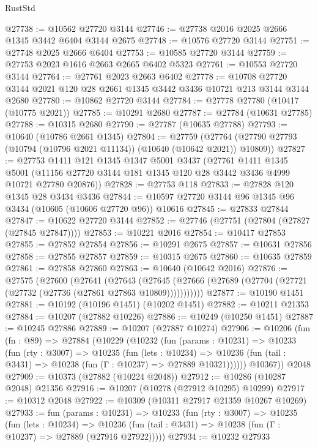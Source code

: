 \begin{lexlean}{RustStd}
\begin{coremodule}
@27738 := @10562 @27720 @3144
@27746 := @27738 @2016 @2025 @2666 @1345 @3442 @6404 @3144 @2675
@27748 := @10576 @27720 @3144
@27751 := @27748 @2025 @2666 @6404
@27753 := @10585 @27720 @3144
@27759 := @27753 @2023 @1616 @2663 @2665 @6402 @5323
@27761 := @10553 @27720 @3144
@27764 := @27761 @2023 @2663 @6402
@27778 := @10708 @27720 @3144 @2021 @120 @28 @2661 @1345 @3442 @3436 @10721 @213 @3144 @3144 @2680
@27780 := @10862 @27720 @3144
@27784 := @27778 @27780 (@10417 (@10775 @2021))
@27785 := @10291 @2680
@27787 := @27784 (@10631 @27785)
@27788 := @10315 @2680
@27790 := @27787 (@10635 @27788)
@27793 := @10640 (@10786 @2661 @1345)
@27804 := @27759
    (@27764 (@27790 @27793 (@10794 (@10796 @2021 @11134)) (@10640 (@10642 @2021)) @10809))
@27827 := @27753
    @1411
    @121
    @1345
    @1347
    @5001
    @3437
    (@27761
      @1411
      @1345
      @5001
      (@11156 @27720 @3144 @181 @1345 @120 @28 @3442 @3436 @4999 @10721 @27780 @20876))
@27828 := @27753 @118
@27833 := @27828 @120 @1345 @28 @3434 @3436
@27844 := @10597 @27720 @3144 @96 @1345 @96 @3434 (@10605 (@10606 @27720 @96)) @10616
@27845 := @27833 @27844
@27847 := @10622 @27720 @3144
@27852 := @27746 (@27751 (@27804 (@27827 (@27845 @27847))))
@27853 := @10221 @2016
@27854 := @10417 @27853
@27855 := @27852 @27854
@27856 := @10291 @2675
@27857 := @10631 @27856
@27858 := @27855 @27857
@27859 := @10315 @2675
@27860 := @10635 @27859
@27861 := @27858 @27860
@27863 := @10640 (@10642 @2016)
@27876 := @27575
    (@27600
      (@27641
        (@27643
          (@27645 (@27666 (@27689 (@27704 (@27721 (@27732 (@27736 (@27861 @27863 @10809)))))))))))
@27877 := @10190 @1451
@27881 := @10192 (@10196 @1451) (@10202 @1451)
@27882 := @10211 @21353
@27884 := @10207 (@27882 @10226)
@27886 := @10249 (@10250 @1451)
@27887 := @10245 @27886
@27889 := @10207 (@27887 @10274)
@27906 := @10206
    (fun (fn : @89) =>
    @27884
      (@10229
        (@10232
          (fun (params : @10231) =>
          @10233
            (fun (rty : @3007) =>
            @10235
              (fun (lets : @10234) =>
              @10236 (fun (tail : @3431) => @10238 (fun (Γ : @10237) => @27889 @10321))))))
        @10367))
    @2048
@27909 := @10373 (@27882 (@10224 @2048))
@27912 := @10286 (@10287 @2048) @21356
@27916 := @10207 (@10278 (@27912 @10295) @10299)
@27917 := @10312 @2048
@27922 := @10309 (@10311 @27917 @21359 @10267 @10269)
@27933 := fun (params : @10231) =>
  @10233
    (fun (rty : @3007) =>
    @10235
      (fun (lets : @10234) =>
      @10236 (fun (tail : @3431) => @10238 (fun (Γ : @10237) => @27889 (@27916 @27922)))))
@27934 := @10232 @27933

\end{coremodule}
\end{lexlean}

